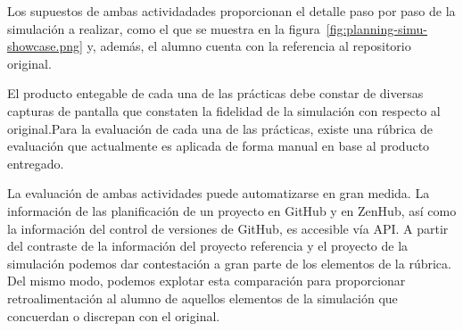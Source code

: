 Los supuestos de ambas actividadades proporcionan el  detalle paso por paso de la simulación a realizar, como el que se muestra en la figura~\ref{fig:planning-simu-showcase.png} y, además, el alumno cuenta con la referencia al repositorio original. 


El producto entegable de cada una de las prácticas debe constar de diversas capturas de pantalla que constaten la fidelidad de la simulación con respecto al original.Para la evaluación de cada una de las prácticas, existe una rúbrica de evaluación que actualmente es aplicada de forma manual en base al producto entregado.


La evaluación de ambas actividades puede automatizarse en gran medida. La información de las planificación de un proyecto en GitHub y en ZenHub, así como la información  del control de versiones de GitHub, es accesible vía API. A partir del contraste de la información del proyecto referencia y el proyecto de la simulación podemos dar contestación a gran parte de los elementos de la rúbrica. Del mismo modo, podemos explotar esta comparación para proporcionar retroalimentación al alumno de aquellos elementos de la simulación que concuerdan o discrepan con el original.
